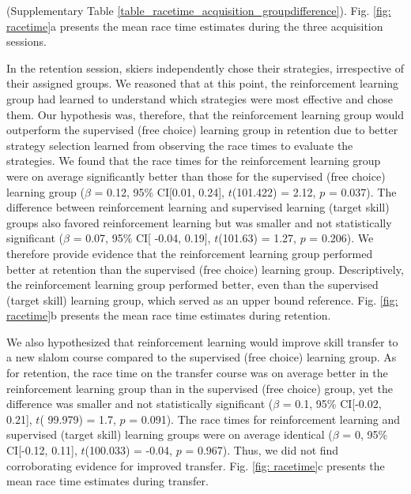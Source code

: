 \documentclass[pdflatex,sn-nature]{sn-jnl}%
\theoremstyle{thmstyleone}%
\theoremstyle{thmstyletwo}%
\theoremstyle{thmstylethree}%
\begin{document}
(Supplementary Table \ref{table_racetime_acquisition_groupdifference}). Fig. \ref{fig: racetime}a presents the mean race time estimates during the three acquisition sessions. 

In the retention session, skiers independently chose their strategies, irrespective of their assigned groups. We reasoned that at this point, the reinforcement learning group had learned to understand which strategies were most effective and chose them. Our hypothesis was, therefore, that the reinforcement learning group would outperform the supervised (free choice) learning group in retention due to better strategy selection learned from observing the race times to evaluate the strategies. We found that the race times for the reinforcement learning group were on average significantly better than those for the supervised (free choice) learning group ($\beta$ = 0.12, 95\% CI[0.01, 0.24], $t$(101.422) = 2.12, $p$ = 0.037). The difference between reinforcement learning and supervised learning (target skill) groups also favored reinforcement learning but was smaller and not statistically significant ($\beta$ = 0.07, 95\% CI[ -0.04, 0.19], $t$(101.63) = 1.27, $p$ = 0.206). We therefore provide evidence that the reinforcement learning group performed better at retention than the supervised (free choice) learning group. Descriptively,  the reinforcement learning group performed better, even than the supervised (target skill) learning group, which served as an upper bound reference. Fig. \ref{fig: racetime}b presents the mean race time estimates during retention. 

We also hypothesized that reinforcement learning would improve skill transfer to a new slalom course compared to the supervised (free choice) learning group. As for retention, the race time on the transfer course was on average better in the reinforcement learning group than in the supervised (free choice) group, yet the difference was smaller and not statistically significant ($\beta$ = 0.1, 95\% CI[-0.02, 0.21], $t$( 99.979) = 1.7, $p$  = 0.091). The race times for reinforcement learning and supervised (target skill) learning groups were on average identical ($\beta$ = 0, 95\% CI[-0.12, 0.11], $t$(100.033) = -0.04, $p$ = 0.967). Thus, we did not find corroborating evidence for improved transfer. Fig. \ref{fig: racetime}c presents the mean race time estimates during transfer. 
\end{document}
